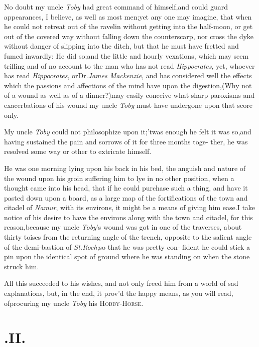 \documentclass{article}
\begin{document}
No doubt my uncle \textit{Toby} had great command of
himself,\tsk and could guard appearances, I believe, as well as
most men;\tsk yet any one may imagine, that when he could not
retreat out of the ravelin without getting into the half-moon,
or get out of the covered way without falling down the
counterscarp, nor cross the dyke without danger of slipping into
the ditch, but that he must have fretted and fumed inwardly:\tsk
He did so;\tsk and the little and hourly vexations, which may
seem trifling and of no account to the man who has not read
\textit{Hippocrates}, yet, whoever has read
\textit{Hippocrates}, or\break Dr.\@ \textit{James Mackenzie},
and has considered well the effects which the passions and
affections of the mind have upon the digestion,\tsk (Why not of a
wound as well as of a dinner?)\tsk may easily conceive what
sharp paroxisms and exacerbations of his wound my uncle
\textit{Toby} must have undergone upon that score only.

\tsk My uncle \textit{Toby} could not philoso\-phize upon
it;\tsk ’twas enough he felt it\break
was so,\tsk and having sustained the pain\break
and sorrows of it for three months toge- ther, he was resolved some
way or other to extricate himself.

He was one morning lying upon his back in his bed, the anguish and nature\break
of the wound upon his groin suffering him to lye in no other position, when a
thought came into his head, that if he could purchase such a thing, and have it
pasted down upon a board, as a large map of the fortifications of the town and
citadel of \textit{Namur}, with its environs, it might be a means of giving him
ease.\tsk\break I take notice of his desire to have the environs along with the
town and cita\-del, for this reason,\tsk because my uncle \textit{Toby}’s
wound was got in one of the traverses, about thirty toises from the returning
angle of the trench, opposite to the salient angle of the demi-bastion of
\textit{St.\@ Roch};\tsh so that he was pretty con- fident he could stick a
pin upon the identical spot of ground where he was standing on when the stone
struck him.


All this succeeded to his wishes, and not only freed him from a
world of sad explanations, but, in the end, it prov’d\break
the happy means, as you will read, of\break procuring my
uncle \textit{Toby} his \textsc{Hobby-}\break\textsc{Horse}.


\section{.\enspace  II.}
\end{document}

